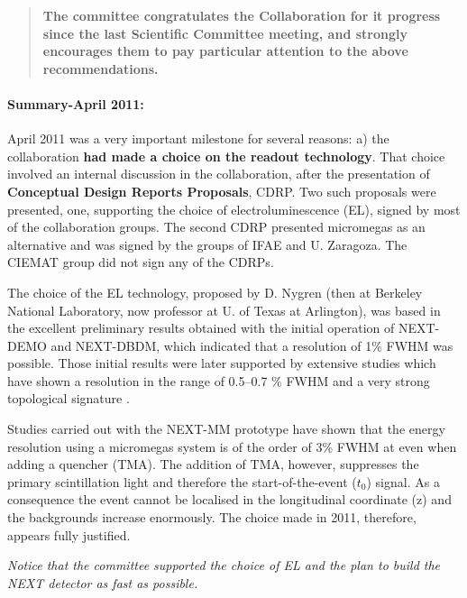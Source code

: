 \begin{quotation}
{\bf The committee congratulates the Collaboration for it progress since the last Scientific Committee meeting, and strongly encourages them to pay particular attention to the above recommendations. }

\end{quotation}

\paragraph{Summary-April 2011:} April 2011 was a very important milestone for several reasons: a) the collaboration 
{\bf had made a choice on the readout technology}. That choice involved an internal discussion in the collaboration, after the presentation of {\bf Conceptual Design Reports Proposals}, CDRP. Two such proposals were presented, one, supporting the choice of electroluminescence (EL), signed by most of the collaboration groups. The second CDRP presented micromegas as an alternative and was signed by the groups of IFAE and U. Zaragoza. The CIEMAT group did not sign any of the CDRPs.

The choice of the EL technology, proposed by D. Nygren (then at Berkeley National Laboratory, now professor at U. of Texas at Arlington), was based in the excellent preliminary results obtained with the initial operation of NEXT-DEMO and NEXT-DBDM, which indicated that a resolution of 1\% FWHM was possible. Those initial results were later supported by extensive studies which have shown a resolution in the range of 0.5--0.7 \% FWHM  \cite{Alvarez:2012yxw, Alvarez:2012zsz,Alvarez:2012hu,Alvarez:2013gxa,Lorca:2014sra,Renner:2014mha,Serra:2014zda} and a very strong topological signature  \cite{Ferrario:2015kta}. 

Studies carried out with the NEXT-MM prototype have shown that the energy resolution using a micromegas system is of the order of
3\% FWHM at \Qbb \cite{Alvarez:2013oha,Alvarez:2013kqa} even when adding a quencher (TMA). The addition of TMA, however,  suppresses the primary scintillation light and therefore the start-of-the-event ($t_0$) signal. As a consequence the event cannot be localised in the longitudinal coordinate (z) and the backgrounds increase enormously. The choice made in 2011, therefore, appears fully justified. 

{\em Notice that the committee supported the choice of EL and the plan to build the NEXT detector as fast as possible.}





